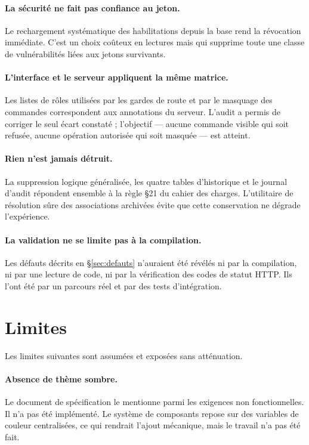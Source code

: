 \paragraph{La sécurité ne fait pas confiance au jeton.} Le rechargement systématique des
habilitations depuis la base rend la révocation immédiate. C'est un choix coûteux en
lectures mais qui supprime toute une classe de vulnérabilités liées aux jetons survivants.

\paragraph{L'interface et le serveur appliquent la même matrice.} Les listes de rôles
utilisées par les gardes de route et par le masquage des commandes correspondent aux
annotations du serveur. L'audit a permis de corriger le seul écart constaté ; l'objectif
--- aucune commande visible qui soit refusée, aucune opération autorisée qui soit masquée
--- est atteint.

\paragraph{Rien n'est jamais détruit.} La suppression logique généralisée, les quatre tables
d'historique et le journal d'audit répondent ensemble à la règle §21 du cahier des charges.
L'utilitaire de résolution sûre des associations archivées évite que cette conservation ne
dégrade l'expérience.

\paragraph{La validation ne se limite pas à la compilation.} Les défauts décrits en
§\ref{sec:defauts} n'auraient été révélés ni par la compilation, ni par une lecture de
code, ni par la vérification des codes de statut HTTP. Ils l'ont été par un parcours réel
et par des tests d'intégration.

\section{Limites}
\label{sec:limites}

Les limites suivantes sont assumées et exposées sans atténuation.

\paragraph{Absence de thème sombre.} Le document de spécification le mentionne parmi les
exigences non fonctionnelles. Il n'a pas été implémenté. Le système de composants repose sur
des variables de couleur centralisées, ce qui rendrait l'ajout mécanique, mais le travail
n'a pas été fait.

